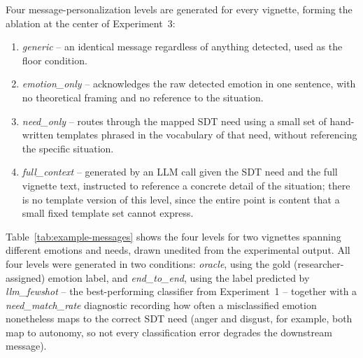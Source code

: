 \documentclass[higheredu,article,submit,pdftex,moreauthors]{Definitions/mdpi}
\begin{document}
Four message-personalization levels are generated for every vignette, forming the ablation at the center of Experiment~3:
\begin{enumerate}
\item \textit{generic} -- an identical message regardless of anything detected, used as the floor condition.
\item \textit{emotion\_only} -- acknowledges the raw detected emotion in one sentence, with no theoretical framing and no reference to the situation.
\item \textit{need\_only} -- routes through the mapped SDT need using a small set of hand-written templates phrased in the vocabulary of that need, without referencing the specific situation.
\item \textit{full\_context} -- generated by an LLM call given the SDT need and the full vignette text, instructed to reference a concrete detail of the situation; there is no template version of this level, since the entire point is content that a small fixed template set cannot express.
\end{enumerate}

Table~\ref{tab:example-messages} shows the four levels for two vignettes spanning different emotions and needs, drawn unedited from the experimental output. All four levels were generated in two conditions: \textit{oracle}, using the gold (researcher-assigned) emotion label, and \textit{end\_to\_end}, using the label predicted by \textit{llm\_fewshot} -- the best-performing classifier from Experiment~1 -- together with a \textit{need\_match\_rate} diagnostic recording how often a misclassified emotion nonetheless maps to the correct SDT need (anger and disgust, for example, both map to autonomy, so not every classification error degrades the downstream message).
\end{document}
